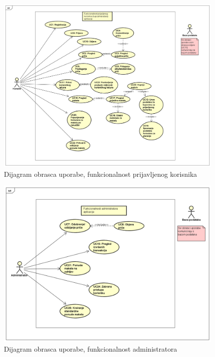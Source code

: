 					\begin{figure}[H]
						\includegraphics[width=.9\linewidth]{slike/Funkcionalnost_prijavljenog_korisnika.PNG} %
						\caption{Dijagram obrasca uporabe, funkcionalnost prijavljenog korisnika}
						\label{fig:obrupo2} %
					\end{figure}

					\begin{figure}[H]
						\includegraphics[width=.9\linewidth]{slike/Funkcionalnost_administratora_sustava.PNG} %
						\caption{Dijagram obrasca uporabe, funkcionalnost administratora}
						\label{fig:obrupo3} %
					\end{figure}

